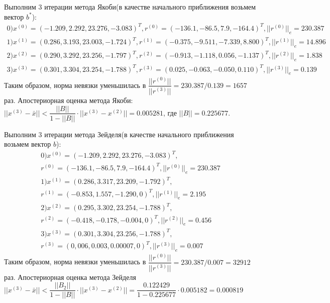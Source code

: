 \documentclass[a4paper,12pt]{report} %
\begin{document}
Выполним 3 итерации метода Якоби(в качестве начального приближения возьмем вектор $b^*$):
\begin{gather*}
	0)x^{(0)} = (-1.209,  2.292, 23.276, -3.083)^T, r^{(0)} = (-136.1,  -86.5, 7.9, -164.4)^T, ||r^{(0)}||_e = 230.387\\
	1)x^{(1)} = (0.286,  3.193, 23.003, -1.724)^T, r^{(1)} = (-0.375, -9.511, -7.339,  8.800)^T, ||r^{(1)}||_e = 14.896\\
	2)x^{(2)} =  (0.290, 3.292, 23.256, -1.797)^T, r^{(2)} =  (-0.913, -1.118,  0.056, -1.137)^T, ||r^{(2)}||_e =  1.838\\
	3)x^{(3)} =  (0.301, 3.304, 23.254, -1.788)^T, r^{(3)} =  (0.025, -0.063, -0.050, 0.110)^T, ||r^{(3)}||_e =  0.139
\end{gather*}
Таким образом, норма невязки уменьшилась в $\dfrac{||r^{(0)}||}{||r^{(3)}||} = 230.387/0.139 = 1657$ раз.
Апостериорная оценка метода Якоби: \newline $||x^{(3)} - \bar{x}|| < \dfrac{||B||}{1 - ||B||} \cdot ||x^{(3)} - x^{(2)}|| =0.005281 $, где $||B|| = 0.225677$.

Выполним 3 итерации метода Зейделя(в качестве начального приближения возьмем вектор $b$):
\begin{gather*}
	0)x^{(0)} = (-1.209,  2.292, 23.276, -3.083)^T,\\
		r^{(0)} = (-136.1,  -86.5, 7.9, -164.4)^T, ||r^{(0)}||_e = 230.387\\
	1)x^{(1)} = (0.286,  3.317, 23.209,   -1.792)^T,\\
		r^{(1)} = (-0.853,   1.557, -1.290,  0)^T, ||r^{(1)}||_e =2.195\\
	2)x^{(2)} =  (0.295,  3.302, 23.254, -1.788)^T, \\
		r^{(2)} =  (-0.418, -0.178, -0.004,  0)^T, ||r^{(2)}||_e = 0.456\\
	3)x^{(3)} =  (0.301,  3.304, 23.256, -1.788)^T, \\
		r^{(3)} =  (0,006, 0.003, 0.00007,  0)^T, ||r^{(3)}||_e = 0.007
\end{gather*}
Таким образом, норма невязки уменьшилась в $\dfrac{||r^{(0)}||}{||r^{(3)}||} = 230.387/0.007 = 32912$ раз.
Апостериорная оценка метода Зейделя $||x^{(3)} - \bar{x}|| < \dfrac{||B_2||}{1 - ||B||} \cdot ||x^{(3)} - x^{(2)}|| = 
 \dfrac{0.122429}{1 - 0.225677} \cdot 0.005182 = 0.000819$
\end{document}
